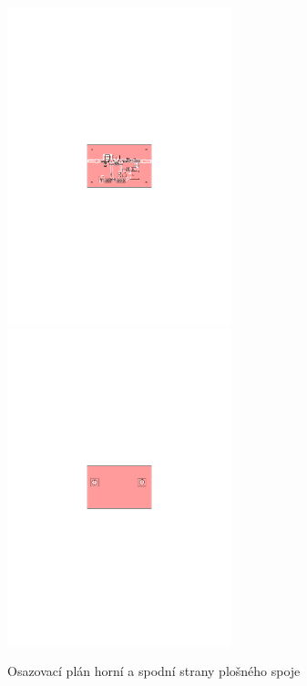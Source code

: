 \documentclass[12pt,a4paper,oneside]{article}
\begin{document}
\newpage


\begin{figure} [h!tbp]
  \centering
  \includegraphics[trim = 7.3cm 12.7cm 7.3cm 12.7cm, clip, width=6.5cm]{../../hw/cam_doc/O1.pdf}
  \includegraphics[trim = 7.3cm 12.7cm 7.3cm 12.7cm, clip, width=6.5cm]{../../hw/cam_doc/O2.pdf}
  \caption{Osazovací plán horní a spodní strany plošného spoje}
  \label{fig:osazovaci_plan}
\end{figure}
\end{document}
